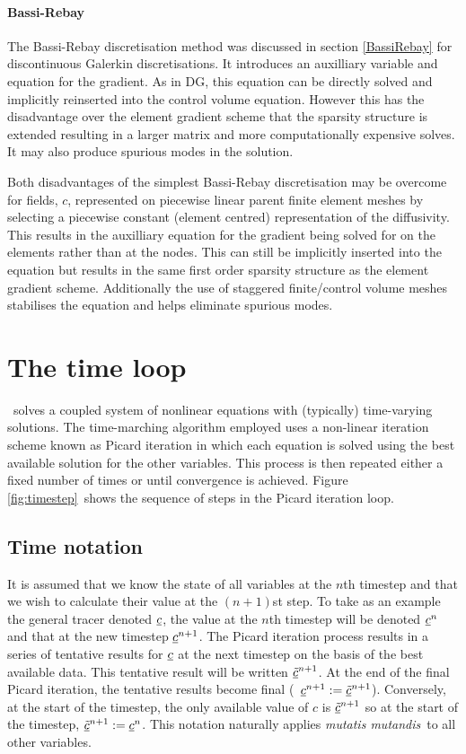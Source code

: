 \paragraph{Bassi-Rebay} \label{sec:cvbrdiff}

The Bassi-Rebay discretisation \citep{bassi1997} method was discussed in section \ref{BassiRebay} for discontinuous Galerkin discretisations.  It introduces an auxilliary variable and equation for the gradient.  As in DG, this equation can be directly solved and implicitly reinserted into the control volume equation.  However this has the disadvantage over the element gradient scheme that the sparsity structure is extended resulting in a larger matrix and more computationally expensive solves.  It may also produce spurious modes in the solution.

Both disadvantages of the simplest Bassi-Rebay discretisation may be overcome for fields, $c$, represented on piecewise linear parent finite element meshes by selecting a piecewise constant (element centred) representation of the diffusivity.  This results in the auxilliary equation for the gradient being solved for on the elements rather than at the nodes.  This can still be implicitly inserted into the equation but results in the same first order sparsity structure as the element gradient scheme.  Additionally the use of staggered finite/control volume meshes stabilises the equation and helps eliminate spurious modes.

\section{The time loop}
\label{sec:ND_time_loop}

\fluidity\ solves a coupled system of nonlinear equations with (typically)
time-varying solutions. The time-marching algorithm employed uses a
non-linear iteration scheme known as Picard iteration in which each equation
is solved using the best available solution for the other variables. This
process is then repeated either a fixed number of times or until convergence
is achieved. Figure \ref{fig:timestep}\ shows the sequence of steps in the
Picard iteration loop.

\subsection{Time notation}

It is assumed that we know the state of all variables at the $n$th timestep
and that we wish to calculate their value at the $(n+1)$st step. To take as an
example the general tracer denoted $\underline{c}$, the value at the $n$th
timestep will be denoted $\underline{c}^{n}$ and that at the new timestep
$\underline{c}^{n+1}$. The Picard iteration process results in a series of
tentative results for $\underline{c}$ at the next timestep on the basis of the
best available data. This tentative result will be written $\underline{\tilde c}^{n+1}$. At the
end of the final Picard iteration, the tentative results become final (\ie\
$\underline{c}^{n+1}:=\underline{\tilde c}^{n+1}$). Conversely, at the start of the timestep, the only
available value of $c$ is $\underline{\tilde c}^{n+1}$ so at the start of the timestep,
$\underline{\tilde c}^{n+1}:=\underline{c}^{n}$. This notation naturally applies \emph{mutatis mutandis}\ to
all other variables.

